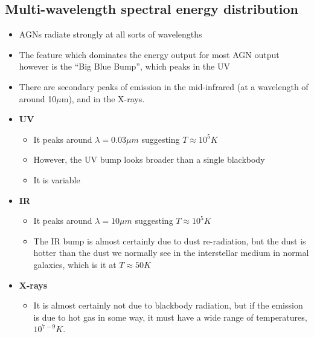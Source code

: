 \documentclass{article}
\begin{document}
\subsection{Multi-wavelength spectral energy distribution}
\begin{itemize}
\item AGNs radiate strongly at all sorts of wavelengths
\item The feature which dominates the energy output for most
AGN output however is the “Big Blue Bump”, which peaks in the UV 
\item There are secondary peaks of emission in the mid-infrared (at a wavelength of around 10$\mu $m), and in the X-rays.
\item \textbf{UV}
\begin{itemize}
\item  It peaks around $\lambda = 0.03 \mu m$ suggesting $T \approx 10^5K$
\item  However, the UV bump looks broader than a single blackbody
\item  It is variable 
\end{itemize}
\item \textbf{IR}
\begin{itemize}
\item   It peaks around $\lambda = 10 \mu m$ suggesting $T \approx 10^5K$
\item The IR bump is almost certainly due to dust re-radiation, but the dust is hotter than the dust we normally see in the interstellar medium in normal galaxies, which is it at $T \approx 50K$
\end{itemize}
\item \textbf{X-rays}
\begin{itemize}
\item  It is almost certainly not due to blackbody radiation, but if the emission is due to hot gas in some way, it must
have a wide range of temperatures, $10^{7-9}K$.
\end{itemize}
\end{itemize}
\end{document}
